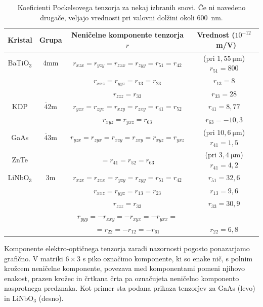 \begin{table}[h!]
 \centering
\begin{tabular}{|c|c|c|c|} \hline  
      Kristal & Grupa & Neničelne komponente tenzorja $r$ & Vrednost ($10^{-12}$~m/V)\\ \hline
      BaTiO$_3$\index{BaTiO$_3$} & 4mm & $r_{xzx} = r_{yzy} = r_{zxx} = r_{zyy} = 
      r_{51} = r_{42}$  &
	    (pri $1,55~\si{\micro\metre}$) $r_{51} = 800$ \\
	      & & $r_{xxz} = r_{yyz} = r_{13} = r_{23}$ &  $r_{13} = 8$ \\
	      & & $r_{zzz} = r_{33}$ & $r_{33} = 28$ \\ \hline
      KDP\index{KDP} & 
      $\overline{4}$2m & $r_{yzx} = r_{zyx} = r_{xzy} = r_{zxy} = r_{41} = r_{52}$  &
	    $r_{41} = 8,77$ \\
	    & & $r_{xyz} = r_{yxz} = r_{63}$ &  $r_{63} = -10,3$ \\ \hline
      GaAs\index{GaAs}\index{ZnTe} &  $\overline{4}$3m&
	  $r_{yzx} = r_{zyx} = r_{xzy} = r_{zxy} = r_{xyz} = r_{yxz}$  & (pri $10,6~\si{\micro\metre}$) $r_{41} = 1,5$ \\
	ZnTe  & &   $= r_{41} = r_{52}=r_{63}$  &(pri $3,4~\si{\micro\metre}$) $r_{41} = 4,2$ 
	    \\ \hline
      LiNbO$_3$\index{LiNbO$_3$} & 3m & $r_{xzx} = r_{zxx} = r_{yzy} = r_{zyy} = r_{51} = r_{42}$  &
	    $r_{51} = 32,6$ \\
	     & & $r_{xxz} = r_{yyz} = r_{13} = r_{23}$ &  $r_{13} = 9,6$ \\
	      & & $r_{zzz} = r_{33}$ & $r_{33} = 30,9$ \\
	    & &  $r_{yyy} = - r_{xxy} = -r_{xyx} = -r_{yxx}  = $ & \\
	    & &  $=r_{22} =  -r_{12} =-r_{61} $  &
	    $r_{22}  = 6,8$ \\
\hline 
\end{tabular}
  \caption{Koeficienti Pockelsovega tenzorja za nekaj izbranih snovi. Če ni navedeno drugače, veljajo
  vrednosti pri valovni dolžini okoli 600~nm.}
\label{table:Pockels}
\end{table}

\begin{remark}
Komponente elektro-optičnega tenzorja zaradi nazornosti pogosto ponazarjamo grafično. V matriki $6\times 3$
s piko označimo komponente, ki so enake nič, s polnim krožcem neničelne komponente, povezava med 
komponentami pomeni njihovo enakost, prazen krožec in črtkana črta pa označujeta 
neničelno komponento nasprotnega predznaka. Kot primer sta podana prikaza tenzorjev za 
GaAs (levo) in LiNbO$_3$ (desno).
\begin{figure}[h!]
\centering
\def\svgwidth{20truemm} 
\qquad \qquad
\def\svgwidth{20truemm} 

\end{figure}
\end{remark}


